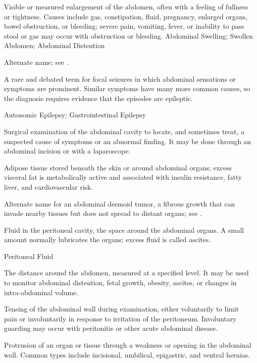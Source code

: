  Visible or measured enlargement of the abdomen, often with a feeling of fullness or tightness. Causes include gas, constipation, fluid, pregnancy, enlarged organs, bowel obstruction, or bleeding; severe pain, vomiting, fever, or inability to pass stool or gas may occur with obstruction or bleeding.
\synonyms
Abdominal Swelling; Swollen Abdomen; Abdominal Distention

 Alternate name; see .

 A rare and debated term for focal seizures in which abdominal sensations or symptoms are prominent. Similar symptoms have many more common causes, so the diagnosis requires evidence that the episodes are epileptic.

\synonyms
Autonomic Epilepsy; Gastrointestinal Epilepsy

 Surgical examination of the abdominal cavity to locate, and sometimes treat, a suspected cause of symptoms or an abnormal finding. It may be done through an abdominal incision or with a laparoscope.

 Adipose tissue stored beneath the skin or around abdominal organs; excess visceral fat is metabolically active and associated with insulin resistance, fatty liver, and cardiovascular risk.

 Alternate name for an abdominal desmoid tumor, a fibrous growth that can invade nearby tissues but does not spread to distant organs; see .

 Fluid in the peritoneal cavity, the space around the abdominal organs. A small amount normally lubricates the organs; excess fluid is called ascites.

\synonyms
Peritoneal Fluid

 The distance around the abdomen, measured at a specified level. It may be used to monitor abdominal distention, fetal growth, obesity, ascites, or changes in intra-abdominal volume.

 Tensing of the abdominal wall during examination, either voluntarily to limit pain or involuntarily in response to irritation of the peritoneum. Involuntary guarding may occur with peritonitis or other acute abdominal disease.

 Protrusion of an organ or tissue through a weakness or opening in the abdominal wall. Common types include incisional, umbilical, epigastric, and ventral hernias.

